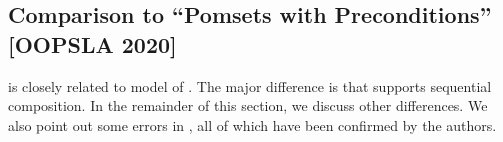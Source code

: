 



\subsection{Comparison to ``Pomsets with Preconditions'' [OOPSLA 2020]}
\label{sec:diff}

\PwTmca{} is closely related to \PwP{} model of
\citep{DBLP:journals/pacmpl/JagadeesanJR20}.  The major difference is that
\PwTmca{} supports sequential composition.  In the remainder of this section,
we discuss other differences.  We also point out some errors in
\cite{DBLP:journals/pacmpl/JagadeesanJR20}, all of which have been confirmed
by the authors.


